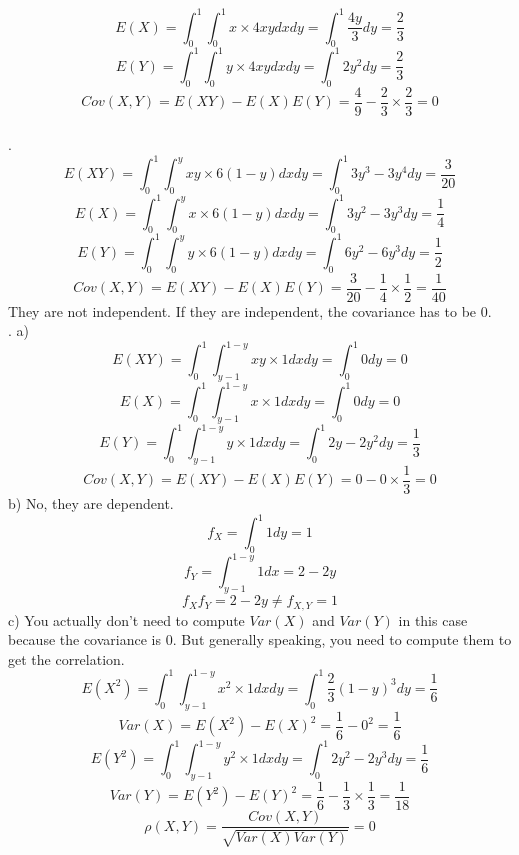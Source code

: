 \documentclass[11pt]{article}
\begin{document}
$$
  E(X) = \int_{0}^{1} \int_{0}^{1}x \times 4xy dxdy
        = \int_{0}^{1} \frac{4y}{3}dy
        = \frac{2}{3}
$$
$$
  E(Y) = \int_{0}^{1} \int_{0}^{1}y \times 4xy dxdy
        = \int_{0}^{1} 2y^2dy
        = \frac{2}{3}
$$
$$Cov(X, Y) = E(XY) - E(X)E(Y) = \frac{4}{9} - \frac{2}{3} \times \frac{2}{3} = 0$$
\\ .
$$
E(XY) = \int_{0}^{1} \int_{0}^{y}xy \times 6(1-y) dxdy
        = \int_{0}^{1} 3y^3 - 3y^4dy
        = \frac{3}{20}
$$
$$
  E(X) = \int_{0}^{1} \int_{0}^{y}x \times 6(1-y) dxdy
        = \int_{0}^{1} 3y^2-3y^3dy
        = \frac{1}{4}
$$
$$
  E(Y) = \int_{0}^{1} \int_{0}^{y}y \times 6(1-y) dxdy
        = \int_{0}^{1} 6y^2 - 6y^3dy
        = \frac{1}{2}
$$
$$Cov(X, Y) = E(XY) - E(X)E(Y) = \frac{3}{20} - \frac{1}{4} \times \frac{1}{2} = \frac{1}{40}$$
They are not independent. If they are independent, the covariance has to be 0.
\\ . \noindent a)
$$
  E(XY) = \int_{0}^{1} \int_{y-1}^{1-y} xy \times 1 dxdy
  = \int_{0}^{1} 0dy
  = 0
$$
$$
  E(X) = \int_{0}^{1} \int_{y-1}^{1-y}x \times 1 dxdy
        = \int_{0}^{1} 0dy
        = 0
$$
$$
  E(Y) = \int_{0}^{1} \int_{y-1}^{1-y}y \times 1 dxdy
        = \int_{0}^{1} 2y-2y^2dy
        = \frac{1}{3}
$$
$$Cov(X, Y) = E(XY) - E(X)E(Y) = 0 - 0 \times \frac{1}{3} = 0$$
\noindent b)
No, they are dependent.
$$f_X = \int_{0}^{1} 1dy = 1$$
$$f_Y = \int_{y-1}^{1-y} 1dx = 2-2y$$
$$f_Xf_Y = 2 - 2y \neq f_{X,Y} = 1$$
\noindent c) You actually don't need to compute $Var(X)$ and $Var(Y)$ in this case because the covariance is 0. But generally speaking, you need to compute them to get the correlation.
$$E(X^2) = \int_{0}^{1} \int_{y-1}^{1-y} x^2 \times 1 dxdy = \int_{0}^{1} \frac{2}{3}(1-y)^3dy = \frac{1}{6}$$
$$Var(X) = E(X^2) - E(X)^2 = \frac{1}{6} - 0^2 = \frac{1}{6}$$
$$E(Y^2) = \int_{0}^{1} \int_{y-1}^{1-y} y^2 \times 1 dxdy = \int_{0}^{1} 2y^2 - 2y^3dy = \frac{1}{6}$$
$$Var(Y) = E(Y^2) - E(Y)^2 = \frac{1}{6} - \frac{1}{3} \times \frac{1}{3} = \frac{1}{18}$$
$$\rho(X,Y) = \frac{Cov(X,Y)}{\sqrt{Var(X)Var(Y)}} = 0$$
\end{document}
